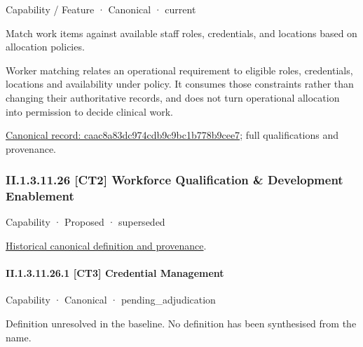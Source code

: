 \label{element:caac8a83dc974cdb9c9bc1b778b9cee7}
{\small Capability / Feature · Canonical · current}\par

Match work items against available staff roles, credentials, and locations based on allocation policies.



Worker matching relates an operational requirement to eligible roles, credentials, locations and availability under policy. It consumes those constraints rather than changing their authoritative records, and does not turn operational allocation into permission to decide clinical work.


{\footnotesize \href{../../../../continuum/strategy/capability/feature/caac8a83dc974cdb9c9bc1b778b9cee7.md}{Canonical record: caac8a83dc974cdb9c9bc1b778b9cee7}; full qualifications and provenance.}\par
\subsubsection*{II.1.3.11.26 [CT2] Workforce Qualification \& Development Enablement}
\label{navigation:II.1.3.11.26}

\label{element:d24a1f4c4f674c45a95c317998ff4186}
{\small Capability · Proposed · superseded}\par
\href{../../../../continuum/strategy/capability/d24a1f4c4f674c45a95c317998ff4186.md}{Historical canonical definition and provenance}.\par
\paragraph*{II.1.3.11.26.1 [CT3] Credential Management}
\label{navigation:II.1.3.11.26.1}

\label{element:3a7a4d2d0ce8446b8a6293284fb16b83}
{\small Capability · Canonical · pending\_adjudication}\par

Definition unresolved in the baseline. No definition has been synthesised from the name.



